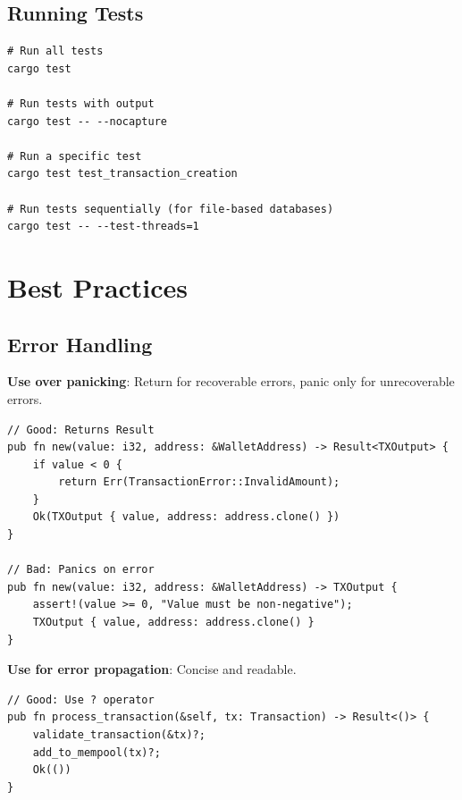 \subsection{Running Tests}
\label{subsec:ch24-test-run}

\begin{verbatim}
# Run all tests
cargo test

# Run tests with output
cargo test -- --nocapture

# Run a specific test
cargo test test_transaction_creation

# Run tests sequentially (for file-based databases)
cargo test -- --test-threads=1
\end{verbatim}

\section{Best Practices}
\label{sec:ch24-best-practices}

\subsection{Error Handling}
\label{subsec:ch24-best-err}

\textbf{Use  over panicking}: Return  for recoverable errors, panic only for unrecoverable errors.

\begin{listing}[H]
\caption{Error handling best practice}
\label{lst:ch24-best-error}
\begin{verbatim}
// Good: Returns Result
pub fn new(value: i32, address: &WalletAddress) -> Result<TXOutput> {
    if value < 0 {
        return Err(TransactionError::InvalidAmount);
    }
    Ok(TXOutput { value, address: address.clone() })
}

// Bad: Panics on error
pub fn new(value: i32, address: &WalletAddress) -> TXOutput {
    assert!(value >= 0, "Value must be non-negative");
    TXOutput { value, address: address.clone() }
}
\end{verbatim}
\end{listing}

\textbf{Use  for error propagation}: Concise and readable.

\begin{listing}[H]
\caption{Error propagation best practice}
\label{lst:ch24-best-propagate}
\begin{verbatim}
// Good: Use ? operator
pub fn process_transaction(&self, tx: Transaction) -> Result<()> {
    validate_transaction(&tx)?;
    add_to_mempool(tx)?;
    Ok(())
}
\end{verbatim}
\end{listing}


